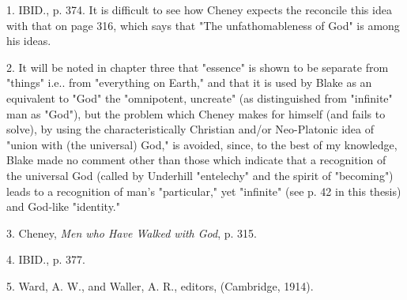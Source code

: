 1. IBID., p. 374. It is difficult to see how Cheney expects the reconcile this idea with that on page 316, which
says that "The unfathomableness of God" is among his ideas.\par
2. It will be noted in chapter three that "essence" is
shown to be separate from "things" i.e.. from "everything on Earth," and that it is used by Blake as an equivalent to
"God" the "omnipotent, uncreate" (as distinguished from "infinite" man as "God"), but the problem which Cheney makes
for himself (and fails to solve), by using the characteristically Christian and/or Neo-Platonic idea of "union with
(the universal) God," is avoided, since, to the best of my knowledge, Blake made no comment other than those which
indicate that a recognition of the universal God (called by Underhill "entelechy" and the spirit of "becoming") leads
to a recognition of man's "particular," yet "infinite" (see p. 42 in this thesis) and God-like "identity."\par
3. Cheney, \textit{Men who Have Walked with God}, p. 315.\par
4. IBID., p. 377.\par
5. Ward, A. W., and Waller, A. R., editors, (Cambridge, 1914).\par

\newpage

{}

